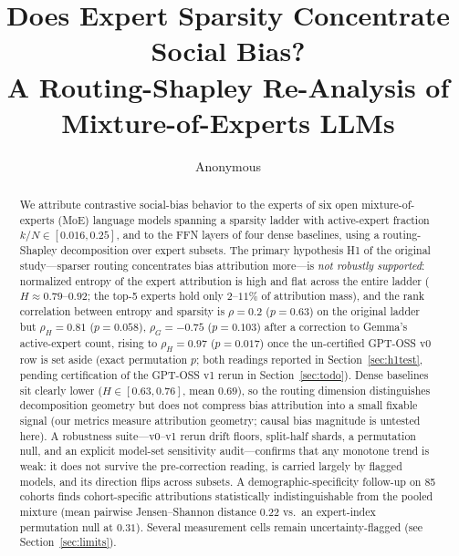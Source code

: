 \documentclass[sigconf]{acmart}
\begin{document}
\title{Does Expert Sparsity Concentrate Social Bias?\\
  A Routing-Shapley Re-Analysis of Mixture-of-Experts LLMs}

\author{Anonymous}
\email{}

\graphicspath{{../../figures/}}

\begin{abstract}
We attribute contrastive social-bias behavior to the experts of six open
mixture-of-experts (MoE) language models spanning a sparsity ladder with
active-expert fraction $k/N \in [0.016, 0.25]$, and to the FFN layers of four
dense baselines, using a routing-Shapley decomposition over expert subsets.
The primary hypothesis H1 of the original study---sparser routing
concentrates bias attribution more---is \emph{not robustly supported}:
normalized entropy of the expert attribution is high and flat across the
entire ladder ($H \approx 0.79$--$0.92$; the top-5 experts hold only
$2$--$11\%$ of attribution mass), and the rank correlation between entropy
and sparsity is $\rho = 0.2$ ($p = 0.63$) on the original ladder but
$\rho_H = 0.81$ ($p = 0.058$), $\rho_G = -0.75$ ($p = 0.103$) after a
correction to Gemma's active-expert count, rising to $\rho_H = 0.97$
($p = 0.017$) once the un-certified GPT-OSS v0 row is set aside (exact
permutation $p$; both readings reported in Section~\ref{sec:h1test},
pending certification of the GPT-OSS v1 rerun in
Section~\ref{sec:todo}). Dense baselines sit clearly lower
($H \in [0.63, 0.76]$, mean $0.69$), so the routing dimension distinguishes
decomposition geometry but does not compress bias attribution into a small
fixable signal (our metrics measure attribution geometry; causal bias
magnitude is untested here). A robustness suite---v0--v1 rerun drift floors, split-half
shards, a permutation null, and an explicit model-set sensitivity
audit---confirms that any monotone trend is weak: it does not survive the
pre-correction reading, is carried largely by flagged models, and its
direction flips across subsets. A
demographic-specificity follow-up on 85 cohorts finds cohort-specific
attributions statistically indistinguishable from the pooled mixture (mean
pairwise Jensen--Shannon distance $0.22$ vs.\ an expert-index permutation
null at $0.31$). Several measurement cells remain uncertainty-flagged (see
Section~\ref{sec:limits}).
\end{abstract}

\end{document}
